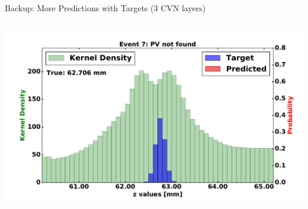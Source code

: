 \begin{frame}{Backup: More Predictions with Targets (3 CVN layers)}
\begin{columns}[c]
\begin{center}
           \includegraphics[width=1\textwidth, height=0.45\textwidth, trim=18 0 18 0]{images/120000_3layer_43.pdf}
       \end{center}
  \end{columns}
\end{frame}

